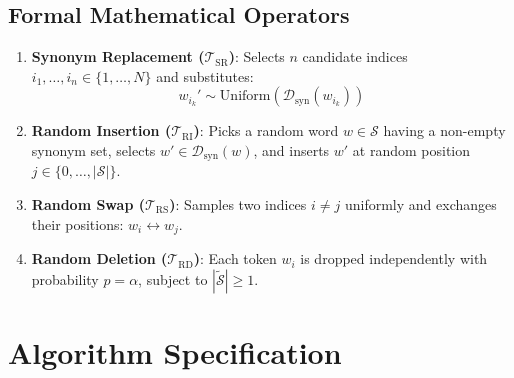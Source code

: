 \documentclass[11pt,a4paper]{article}
\theoremstyle{definition}
\begin{document}
\subsection{Formal Mathematical Operators}
\begin{enumerate}
    \item \textbf{Synonym Replacement ($\mathcal{T}_{\text{SR}}$)}:
    Selects $n$ candidate indices $i_1, \dots, i_n \in \{1, \dots, N\}$ and substitutes:
    \begin{equation}
    w_{i_k}' \sim \text{Uniform}(\mathcal{D}_{\text{syn}}(w_{i_k}))
    \end{equation}
    \item \textbf{Random Insertion ($\mathcal{T}_{\text{RI}}$)}:
    Picks a random word $w \in \mathcal{S}$ having a non-empty synonym set, selects $w' \in \mathcal{D}_{\text{syn}}(w)$, and inserts $w'$ at random position $j \in \{0, \dots, |\mathcal{S}|\}$.
    \item \textbf{Random Swap ($\mathcal{T}_{\text{RS}}$)}:
    Samples two indices $i \ne j$ uniformly and exchanges their positions: $w_i \leftrightarrow w_j$.
    \item \textbf{Random Deletion ($\mathcal{T}_{\text{RD}}$)}:
    Each token $w_i$ is dropped independently with probability $p = \alpha$, subject to $|\tilde{\mathcal{S}}| \ge 1$.
\end{enumerate}

\section{Algorithm Specification}
\end{document}
